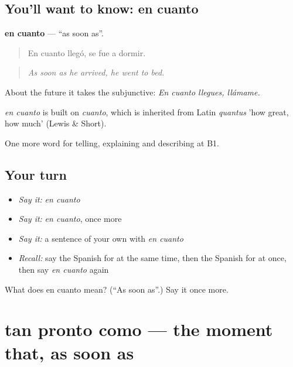 \subsection*{You'll want to know: en cuanto}
\textbf{en cuanto} — \textquotedblleft{}as soon as\textquotedblright{}.

\begin{quote}
En cuanto llegó, se fue a dormir.
\end{quote}

\begin{quote}
\emph{As soon as he arrived, he went to bed.}
\end{quote}

About the future it takes the subjunctive: \emph{En cuanto llegues, llámame.}

\begin{cousinweb}
\emph{en cuanto} is built on \emph{cuanto}, which is inherited from Latin \emph{quantus} 'how great, how much' (Lewis \& Short).
\end{cousinweb}

\begin{grammarlens}[title={What you've built}]
One more word for telling, explaining and describing at B1.
\end{grammarlens}

\subsection*{Your turn}
\begin{itemize}
\raggedright
  \item \emph{Say it:} \emph{en cuanto}
  \item \emph{Say it:} \emph{en cuanto}, once more
  \item \emph{Say it:} a sentence of your own with \emph{en cuanto}
  \item \emph{Recall:} say the Spanish for at the same time, then the Spanish for at once, then say \emph{en cuanto} again
\end{itemize}

\begin{tcolorbox}[breakable,colback=teal!4,colframe=teal!35!black,title={Before you move on}]
What does en cuanto mean? (\textquotedblleft{}As soon as\textquotedblright{}.) Say it once more.
\end{tcolorbox}
\section[tan pronto como]{tan pronto como — the moment that, as soon as}

